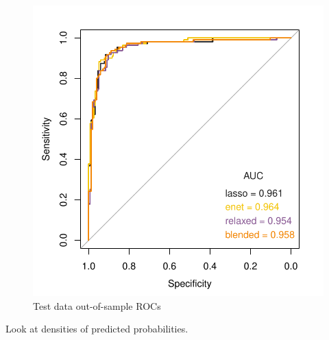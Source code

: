 \documentclass[
]{book}
\begin{document}
\begin{figure}
\centering
\includegraphics{Static/figures/testROC2-1.pdf}
\caption{\label{fig:testROC2}Test data out-of-sample ROCs}
\end{figure}

Look at densities of predicted probabilities.
\end{document}
